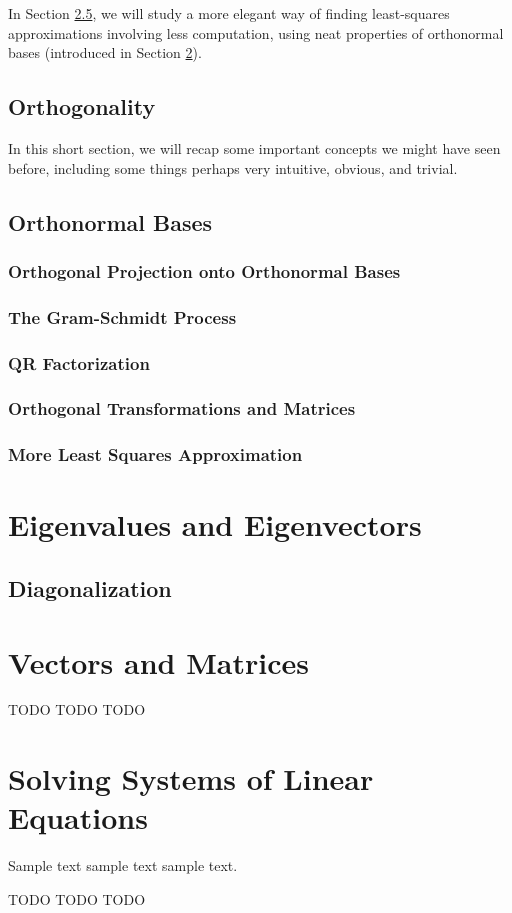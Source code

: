 \documentclass[]{book}
\begin{document}

In Section \ref{section: more least squares approximation}, we will study a more elegant way of finding least-squares approximations involving less computation, using neat properties of orthonormal bases (introduced in Section \ref{section: orthonormal bases}).
\section{Orthogonality}

In this short section, we will recap some important concepts we might have seen before, including some things perhaps very intuitive, obvious, and trivial.


\section{Orthonormal Bases}
\label{section: orthonormal bases}
\subsection{Orthogonal Projection onto Orthonormal Bases}
\subsection{The Gram-Schmidt Process}
\subsection{QR Factorization}
\subsection{Orthogonal Transformations and Matrices}
\subsection{More Least Squares Approximation}
\label{section: more least squares approximation}

\chapter{Eigenvalues and Eigenvectors}

\section{Diagonalization}

\appendix
\chapter{Vectors and Matrices}
TODO TODO TODO

\chapter{Solving Systems of Linear Equations}
Sample text sample text sample text.

TODO TODO TODO
\end{document}
